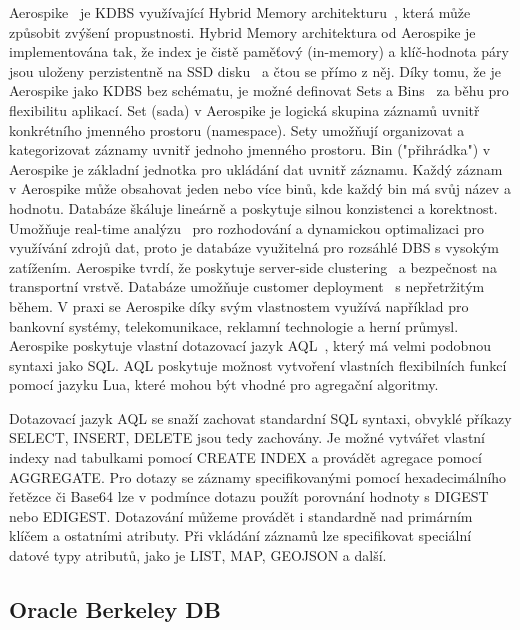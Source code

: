 \documentclass[czech,master,dept460,male,csharp,cpdeclaration]{diploma}
\begin{document}
	Aerospike~\cite{aerospike} je KDBS využívající Hybrid Memory architekturu~\cite{hybmem-arch}, která může způsobit zvýšení propustnosti. Hybrid Memory architektura od Aerospike je implementována tak, že index je čistě paměťový (in-memory) a klíč-hodnota páry jsou uloženy perzistentně na SSD disku~\cite{ssd-avast} a čtou se přímo z něj. Díky tomu, že je Aerospike jako KDBS bez schématu, je možné definovat Sets a Bins~\cite{aerospike-datamodel} za běhu pro flexibilitu aplikací. Set (sada) v Aerospike je logická skupina záznamů uvnitř konkrétního jmenného prostoru (namespace). Sety umožňují organizovat a kategorizovat záznamy uvnitř jednoho jmenného prostoru. Bin ("přihrádka") v Aerospike je základní jednotka pro ukládání dat uvnitř záznamu. Každý záznam v Aerospike může obsahovat jeden nebo více binů, kde každý bin má svůj název a hodnotu. Databáze škáluje lineárně a poskytuje silnou konzistenci a korektnost. Umožňuje real-time analýzu~\cite{aerospike-rtanalysis} pro rozhodování a dynamickou optimalizaci pro využívání zdrojů dat, proto je databáze využitelná pro rozsáhlé DBS s vysokým zatížením. Aerospike tvrdí, že poskytuje server-side clustering~\cite{aerospike-clustering} a bezpečnost na transportní vrstvě. Databáze umožňuje customer deployment~\cite{aerospike-deployment} s nepřetržitým během. V praxi se Aerospike díky svým vlastnostem využívá například pro bankovní systémy, telekomunikace, reklamní technologie a herní průmysl. Aerospike poskytuje vlastní dotazovací jazyk AQL~\cite{aql}, který má velmi podobnou syntaxi jako SQL. AQL poskytuje možnost vytvoření vlastních flexibilních funkcí pomocí jazyku Lua, které mohou být vhodné pro agregační algoritmy.
	
	Dotazovací jazyk AQL se snaží zachovat standardní SQL syntaxi, obvyklé příkazy SELECT, INSERT, DELETE jsou tedy zachovány. Je možné vytvářet vlastní indexy nad tabulkami pomocí CREATE INDEX a provádět agregace pomocí AGGREGATE. Pro dotazy se záznamy specifikovanými pomocí hexadecimálního řetězce či Base64 lze v podmínce dotazu použít porovnání hodnoty s DIGEST nebo EDIGEST. Dotazování můžeme provádět i standardně nad primárním klíčem a ostatními atributy. Při vkládání záznamů lze specifikovat speciální datové typy atributů, jako je LIST, MAP, GEOJSON a další.
	
	\subsection{Oracle Berkeley DB} \label{lab-oracle-berkleydb}
	
\end{document}
